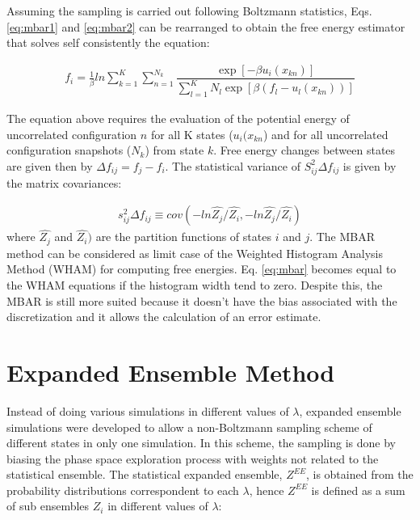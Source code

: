 Assuming the sampling is carried out following Boltzmann statistics, Eqs. \eqref{eq:mbar1} and \eqref{eq:mbar2} can be rearranged to obtain the free energy estimator that solves self consistently the equation:  

\begin{equation}
\label{eq:mbar}
\begin{aligned}
f_{i} = \frac{1}{\beta}ln \sum_{k=1}^{K} \sum_{n=1}^{N_{k}}
\dfrac{\exp[-\beta u_{i}(x_{kn})]}{\sum_{l=1}^{K} N_{l} \exp[\beta (f_{l} - u_{l}(x_{kn}))]}
\end{aligned}
\end{equation}

The equation above requires the evaluation of the potential energy  of uncorrelated configuration $n$ for all K states ($u_{i}(x_{kn}$) and for all uncorrelated configuration snapshots ($N_{k}$) from state $k$. Free energy changes between states are given then by $\Delta f_{ij} = f_{j} -  f_{i}$. The statistical variance of $S_{ij}^{2} \Delta f_{ij}$ is given by the matrix covariances:

\begin{equation}
\label{eq:varmbar}
\begin{aligned}
s_{ij}^{2} \Delta f_{ij} \equiv cov (-ln \hat{Z_{j}}/\hat{Z_{i}},-ln \hat{Z_{j}}/\hat{Z_{i}})
\end{aligned}
\end{equation}
where $\hat{Z_{j}}$ and $\hat{Z_{i}})$ are the partition functions of states $i$ and $j$. The MBAR method can be considered as limit case of the 
Weighted Histogram Analysis Method (WHAM) \cite{wham} for computing free energies. Eq. \eqref{eq:mbar} becomes equal to the WHAM equations if the histogram width tend to zero. Despite this, the MBAR is still more suited because it doesn't have the bias associated with the discretization  and it allows the calculation of an error estimate.

\section{Expanded Ensemble Method}\label{ee}
Instead of doing various simulations in different values of $\lambda$, expanded ensemble simulations \cite{lyubartsev} were developed to allow a non-Boltzmann sampling scheme of different states in only one simulation. In this scheme, the sampling is done by biasing the phase space exploration process with weights not related to the statistical ensemble. The statistical expanded ensemble, $Z^{EE}$, is obtained from the probability distributions correspondent to each $\lambda$, hence $Z^{EE}$ is defined as a sum of sub ensembles $Z_{i}$ in different values of $\lambda$:

